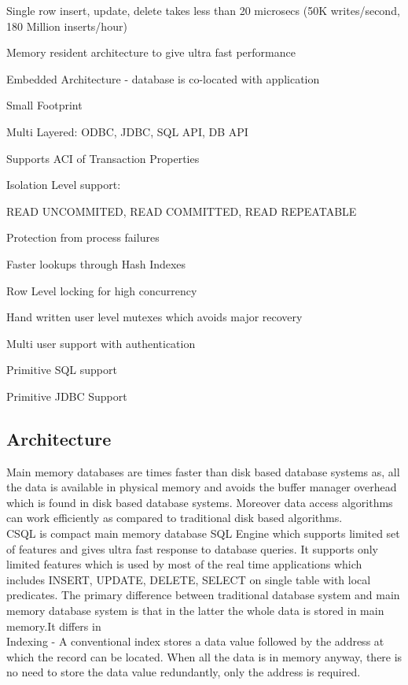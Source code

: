 \documentclass[12pt]{article}
\begin{document}
Single row insert, update, delete takes less than 20 microsecs (50K writes/second, 180 Million inserts/hour)

Memory resident architecture to give ultra fast performance

Embedded Architecture - database is co-located with application

Small Footprint

Multi Layered: ODBC, JDBC, SQL API, DB API

Supports ACI of Transaction Properties

Isolation Level support:

    READ UNCOMMITED, READ COMMITTED, READ REPEATABLE 

Protection from process failures

Faster lookups through Hash Indexes

Row Level locking for high concurrency

Hand written user level mutexes which avoids major recovery

Multi user support with authentication

Primitive SQL support

Primitive JDBC Support


\subsection{Architecture}
\label{arch}
Main memory databases are times faster than disk based database systems as, all the data is available 
in physical memory and avoids the buffer manager overhead which is found in disk based database systems. 
Moreover data access algorithms can work efficiently as compared to traditional disk based algorithms. \\

CSQL is compact main memory database SQL Engine which supports limited set of features and gives ultra 
fast response to database queries. It supports only limited features which is used by most of the real time 
applications which includes INSERT, UPDATE, DELETE, SELECT on single table with local predicates.
The primary difference between traditional database system and main memory database system is that in the 
latter the whole data is stored in main memory.It differs in \\

    Indexing - A conventional index stores a data value followed by the address at which the record can be 
               located. When all the data is in memory anyway, there is no need to store the data value 
               redundantly, only the address is required. \\
\end{document}
